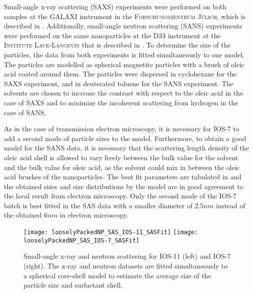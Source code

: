 \documentclass[\main/dresen_thesis.tex]{subfiles}
\begin{document}
Small-angle x-ray scattering (SAXS) experiments were performed on both samples at the \textsc{GALAXI} instrument in the \textsc{Forschungszentrum J\"ulich}, which is described in .
Additionally, small-angle neutron scattering (SANS) experiments were performed on the same nanoparticles at the \textsc{D33} instrument at the \textsc{Institute Laue-Langevin} that is described in .
To determine the size of the particles, the data from both experiments is fitted simultaneously to one model.
The particles are modelled as spherical magnetite particles with a brush of oleic acid coated around them.
The particles were dispersed in cyclohexane for the SAXS experiment, and in deuterated toluene for the SANS experiment.
The solvents are chosen to increase the contrast with respect to the oleic acid in the case of SAXS and to minimize the incoherent scattering from hydrogen in the case of SANS.

As in the case of transmission electron microscopy, it is necessary for IOS-7 to add a second mode of particle sizes to the model.
Furthermore, to obtain a good model for the SANS data, it is necessary that the scattering length density of the oleic acid shell is allowed to vary freely between the bulk value for the solvent and the bulk value for oleic acid, as the solvent could mix in between the oleic acid brushes of the nanoparticles.
The best fit parameters are tabulated in  and the obtained sizes and size distributions by the model are in good agreement to the local result from electron microscopy.
Only the second mode of the IOS-7 batch is best fitted in the SAS data with a smaller diameter of $2.5 \unit{nm}$ instead of the obtained $6 \unit{nm}$ in electron microscopy.

\begin{figure}[tb]
  \centering
  \texttt{[image: looselyPackedNP\_SAS\_IOS-11\_SASFit]}
  \texttt{[image: looselyPackedNP\_SAS\_IOS-7\_SASFit]}
  \caption{\label{fig:looselyPackedNP:nanoparticle:sas}Small-angle x-ray and neutron scattering for IOS-11 (left) and IOS-7 (right). The x-ray and neutron datasets are fitted simultaneously to a spherical core-shell model to estimate the average size of the particle size and surfactant shell.}
\end{figure}
\end{document}
